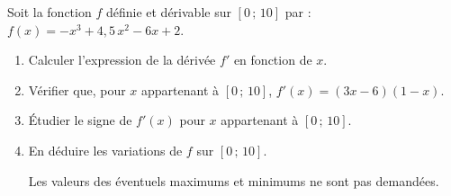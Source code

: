 Soit la fonction $f$ définie et dérivable sur $[0\,;\,10]$ par :\quad $f(x)=-x^{3}+4{,}5\,x^{2}-6x+2$.
	
	\begin{enumerate}
		\item Calculer l'expression de la dérivée $f'$ en fonction de $x$.
		\item Vérifier que, pour $x$ appartenant à $[0\,;\,10]$, $f'(x)=(3x-6)(1-x)$.
		\item Étudier le signe de $f'(x)$ pour $x$ appartenant à $[0\,;\,10]$.
		\item En déduire les variations de $f$ sur $[0\,;\,10]$.
		
		Les valeurs des éventuels maximums et minimums ne sont pas demandées.
	\end{enumerate}
